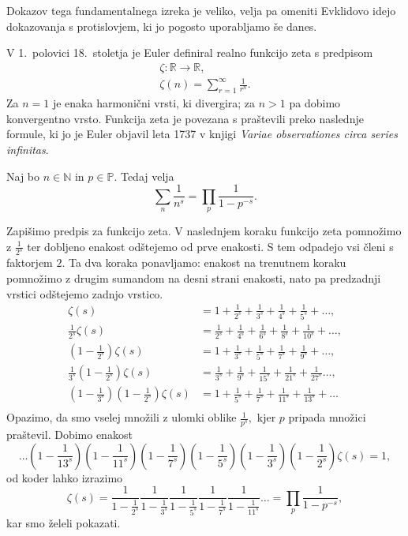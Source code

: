 \documentclass[mat1]{fmfdelo}
\begin{document}
Dokazov tega fundamentalnega izreka je veliko, velja pa omeniti Evklidovo idejo dokazovanja s protislovjem, ki jo pogosto uporabljamo še danes.

V 1.~polovici 18.~stoletja je Euler definiral realno funkcijo zeta s predpisom
\begin{align}
\zeta \colon \mathbb{R} \rightarrow \mathbb{R}, \nonumber \\
\zeta(n) = \sum_{r=1}^{\infty}\frac{1}{r^n}.
\end{align}
Za $n=1$ je enaka harmonični vrsti, ki divergira; za $n>1$ pa dobimo konvergentno vrsto. Funkcija zeta je povezana s praštevili preko naslednje formule, ki jo je Euler objavil leta 1737 v knjigi \emph{Variae observationes circa series infinitas}.

\begin{izrek}
\label{izr:EulProdukt}
Naj bo $n\in\mathbb{N}$ in $p\in\mathbb{P}$. Tedaj velja
\begin{equation}
\sum_{n}\frac{1}{n^s} = \prod_{p}\frac{1}{1-p^{-s}}.
\end{equation}
\end{izrek}

\begin{dokaz}
Zapišimo predpis za funkcijo zeta. V naslednjem koraku funkcijo zeta pomnožimo z $\frac{1}{2^s}$ ter dobljeno enakost odštejemo od prve enakosti. S tem odpadejo vsi členi s faktorjem $2$. Ta dva koraka ponavljamo: enakost na trenutnem koraku pomnožimo z drugim sumandom na desni strani enakosti, nato pa predzadnji vrstici odštejemo zadnjo vrstico.
\begin{align*}
	\zeta(s) &= 1 + \frac{1}{2^s} + \frac{1}{3^s} + \frac{1}{4^s} + \frac{1}{5^s} + \ldots, \nonumber \\
	\frac{1}{2^s} \zeta(s) &= \frac{1}{2^s} + \frac{1}{4^s} + \frac{1}{6^s} + \frac{1}{8^s} + \frac{1}{10^s} + \ldots, \nonumber \\
	\left(1-\frac{1}{2^s}\right) \zeta(s) &= 1 + \frac{1}{3^s} + \frac{1}{5^s} + \frac{1}{7^s} + \frac{1}{9^s} + \ldots, \nonumber \\
	\frac{1}{3^s} \left(1-\frac{1}{2^s}\right) \zeta(s) &= \frac{1}{3^s} + \frac{1}{9^s} + \frac{1}{15^s} + \frac{1}{21^s} + \frac{1}{27^s} \ldots, \nonumber \\
	\left(1-\frac{1}{3^s}\right)\left (1-\frac{1}{2^s}\right) \zeta(s) &= 1 + \frac{1}{5^s} + \frac{1}{7^s} + \frac{1}{11^s} + \frac{1}{13^s} + \ldots \nonumber \\
\end{align*}
Opazimo, da smo vselej množili z ulomki oblike $\frac{1}{p^s},$ kjer $p$ pripada množici praštevil. Dobimo enakost
	\[ \ldots \left(1-\frac{1}{13^s}\right) \left(1-\frac{1}{11^s}\right) \left(1-\frac{1}{7^s}\right) \left(1-\frac{1}{5^s}\right) \left(1-\frac{1}{3^s}\right) 		\left(1-\frac{1}{2^s}\right) \zeta(s) = 1, \]
od koder lahko izrazimo
	\[ \zeta(s) = \frac{1}{1-\frac{1}{2^s}} \frac{1}{1-\frac{1}{3^s}} \frac{1}{1-\frac{1}{5^s}} \frac{1}{1-\frac{1}{7^s}} \frac{1}{1-\frac{1}{11^s}} \ldots = 		\prod_{p}\frac{1}{1-p^{-s}}, \]
kar smo želeli pokazati.
\end{dokaz}
\end{document}
